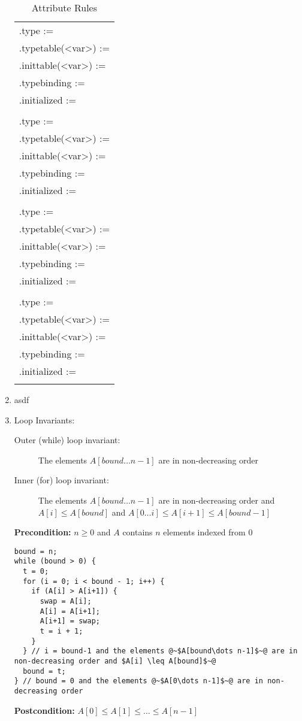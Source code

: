 \documentclass{article}
\begin{document}
\begin{enumerate}
\begin{longtable}[t]{P{1}}
.type := \\
.typetable(<var>) := \\
.inittable(<var>) := \\
.typebinding := \\
.initialized := \\\\

.type := \\
.typetable(<var>) := \\
.inittable(<var>) := \\
.typebinding := \\
.initialized := \\\\

.type := \\
.typetable(<var>) := \\
.inittable(<var>) := \\
.typebinding := \\
.initialized := \\\\

.type := \\
.typetable(<var>) := \\
.inittable(<var>) := \\
.typebinding := \\
.initialized := \\
\caption{Attribute Rules}
\end{longtable}

\item asdf
\item Loop Invariants: 
    \begin{description}
    \item [Outer (while) loop invariant:] The elements $A[bound \dots n-1]$ are in non-decreasing order
    \item [Inner (for) loop invariant:] The elements $A[bound \dots n-1]$ are in non-decreasing order and\\ 
                                        $A[i] \leq A[bound]$ and $A[0\dots i] \leq A[i+1] \leq A[bound-1]$
    \end{description}
{\bf Precondition:} $n \ge 0$ and $A$ contains $n$ elements indexed from 0
\begin{lstlisting}
bound = n;
while (bound > 0) {
  t = 0;
  for (i = 0; i < bound - 1; i++) {
    if (A[i] > A[i+1]) {
      swap = A[i];
      A[i] = A[i+1];
      A[i+1] = swap;
      t = i + 1;
    }
  } // i = bound-1 and the elements @~$A[bound\dots n-1]$~@ are in non-decreasing order and $A[i] \leq A[bound]$~@
  bound = t;
} // bound = 0 and the elements @~$A[0\dots n-1]$~@ are in non-decreasing order
\end{lstlisting}
{\bf Postcondition:} $A[0] \le A[1] \le \dots \le A[n-1]$


\end{enumerate}
\end{document}
